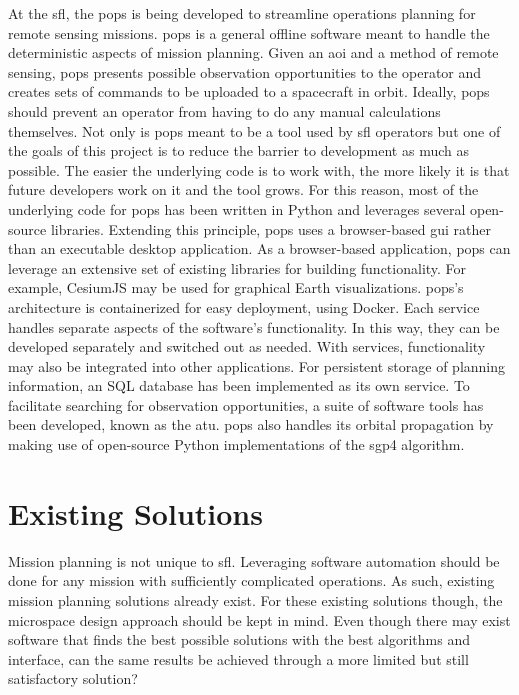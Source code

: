 At the \gls{sfl}, the \gls{pops} is being developed to streamline operations
planning for remote sensing missions. \gls{pops} is a general offline software
meant to handle the deterministic aspects of mission planning.  Given an
\gls{aoi} and a method of remote sensing, \gls{pops} presents possible
observation opportunities to the operator and creates sets of commands to be
uploaded to a spacecraft in orbit.  Ideally, \gls{pops} should prevent an
operator from having to do any manual calculations themselves. Not only is
\gls{pops} meant to be a tool used by \gls{sfl} operators but one of the goals
of this project is to reduce the barrier to development as much as possible.
The easier the underlying code is to work with, the more likely it is that
future developers work on it and the tool grows. For this reason, most of the
underlying code for \gls{pops} has been written in Python and leverages several
open-source libraries.  Extending this principle, \gls{pops} uses a
browser-based \gls{gui} rather than an executable desktop application. As a
browser-based application, \gls{pops} can leverage an extensive set of existing
libraries for building functionality.  For example, CesiumJS may be used for
graphical Earth visualizations.  \gls{pops}’s architecture is containerized for
easy deployment, using Docker.  Each service handles separate aspects of the
software’s functionality.  In this way, they can be developed separately and
switched out as needed. With services, functionality may also be integrated
into other applications. For persistent storage of planning information, an SQL
database has been implemented as its own service.  To facilitate searching for
observation opportunities, a suite of software tools has been developed, known
as the \gls{atu}.  \gls{pops} also handles its orbital propagation by making
use of open-source Python implementations of the \gls{sgp4} algorithm. 


\section{Existing Solutions}\label{sec:exsoln}

Mission planning is not unique to \gls{sfl}. Leveraging software automation
should be done for any mission with sufficiently complicated operations.  As
such, existing mission planning solutions already exist. For these existing
solutions though, the microspace design approach should be kept in mind. Even
though there may exist software that finds the best possible solutions with the
best algorithms and interface, can the same results be achieved through a more
limited but still satisfactory solution? 


